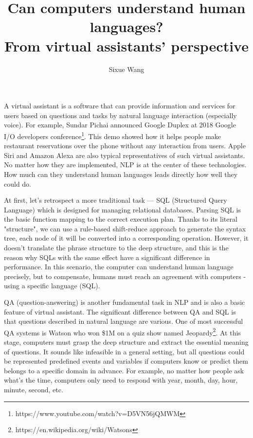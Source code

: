 \documentclass{article}
\title{Can computers understand human languages?\\\smaller{}From virtual assistants' perspective}
\author{Sixue Wang}
\begin{document}
\maketitle

A virtual assistant is a software that can provide information and services for users based on questions and tasks by natural language interaction (especially voice). For example, Sundar Pichai announced Google Duplex at 2018 Google I/O developers conference\footnote{https://www.youtube.com/watch?v=D5VN56jQMWM}. This demo showed how it helps people make restaurant reservations over the phone without any interaction from users. Apple Siri and Amazon Alexa are also typical representatives of such virtual assistants. No matter how they are implemented, NLP is at the center of these technologies. How much can they understand human languages leads directly how well they could do.

At first, let’s retrospect a more traditional task --- SQL (Structured Query Language) which is designed for managing relational databases. Parsing SQL is the basic function mapping to the correct execution plan. Thanks to its literal "structure", we can use a rule-based shift-reduce approach to generate the syntax tree, each node of it will be converted into a corresponding operation. However, it doesn’t translate the phrase structure to the deep structure, and this is the reason why SQLs with the same effect have a significant difference in performance. In this scenario, the computer can understand human language precisely, but to compensate, humans must reach an agreement with computers - using a specific language (SQL).

QA (question-answering) is another fundamental task in NLP and is also a basic feature of virtual assistant. The significant difference between QA and SQL is that questions described in natural language are various. One of most successful QA systems is Watson who won \$1M on a quiz show named Jeopardy\footnote{https://en.wikipedia.org/wiki/Watsons}. At this stage, computers must grasp the deep structure and extract the essential meaning of questions. It sounds like infeasible in a general setting, but all questions could be represented predefined events and variables if computers know or predict them belongs to a specific domain in advance. For example, no matter how people ask what’s the time, computers only need to respond with year, month, day, hour, minute, second, etc.
\end{document}
